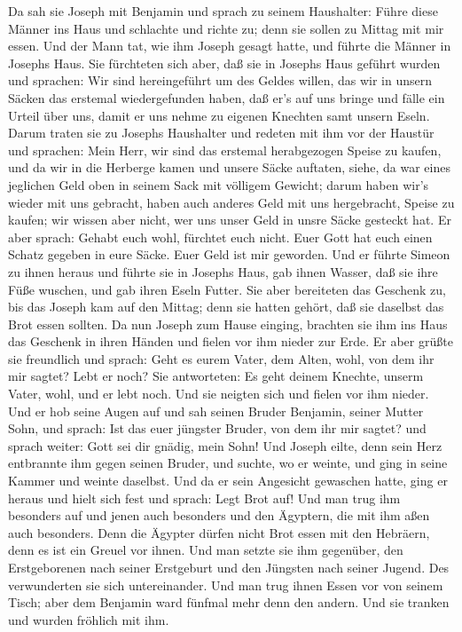  Da sah sie Joseph mit Benjamin und sprach zu seinem
Haushalter: Führe diese Männer ins Haus und schlachte und richte zu;
denn sie sollen zu Mittag mit mir essen.  Und der Mann tat,
wie ihm Joseph gesagt hatte, und führte die Männer in Josephs Haus.
 Sie fürchteten sich aber, daß sie in Josephs Haus geführt
wurden und sprachen: Wir sind hereingeführt um des Geldes willen, das
wir in unsern Säcken das erstemal wiedergefunden haben, daß er's auf uns
bringe und fälle ein Urteil über uns, damit er uns nehme zu eigenen
Knechten samt unsern Eseln.  Darum traten sie zu Josephs
Haushalter und redeten mit ihm vor der Haustür  und
sprachen: Mein Herr, wir sind das erstemal herabgezogen Speise zu
kaufen,  und da wir in die Herberge kamen und unsere Säcke
auftaten, siehe, da war eines jeglichen Geld oben in seinem Sack mit
völligem Gewicht; darum haben wir's wieder mit uns gebracht,
 haben auch anderes Geld mit uns hergebracht, Speise zu
kaufen; wir wissen aber nicht, wer uns unser Geld in unsre Säcke
gesteckt hat.  Er aber sprach: Gehabt euch wohl, fürchtet
euch nicht. Euer Gott hat euch einen Schatz gegeben in eure Säcke. Euer
Geld ist mir geworden. Und er führte Simeon zu ihnen heraus
 und führte sie in Josephs Haus, gab ihnen Wasser, daß sie
ihre Füße wuschen, und gab ihren Eseln Futter.  Sie aber
bereiteten das Geschenk zu, bis das Joseph kam auf den Mittag; denn sie
hatten gehört, daß sie daselbst das Brot essen sollten.  Da
nun Joseph zum Hause einging, brachten sie ihm ins Haus das Geschenk in
ihren Händen und fielen vor ihm nieder zur Erde.  Er aber
grüßte sie freundlich und sprach: Geht es eurem Vater, dem Alten, wohl,
von dem ihr mir sagtet? Lebt er noch?  Sie antworteten: Es
geht deinem Knechte, unserm Vater, wohl, und er lebt noch. Und sie
neigten sich und fielen vor ihm nieder.  Und er hob seine
Augen auf und sah seinen Bruder Benjamin, seiner Mutter Sohn, und
sprach: Ist das euer jüngster Bruder, von dem ihr mir sagtet? und sprach
weiter: Gott sei dir gnädig, mein Sohn!  Und Joseph eilte,
denn sein Herz entbrannte ihm gegen seinen Bruder, und suchte, wo er
weinte, und ging in seine Kammer und weinte daselbst.  Und
da er sein Angesicht gewaschen hatte, ging er heraus und hielt sich fest
und sprach: Legt Brot auf!  Und man trug ihm besonders auf
und jenen auch besonders und den Ägyptern, die mit ihm aßen auch
besonders. Denn die Ägypter dürfen nicht Brot essen mit den Hebräern,
denn es ist ein Greuel vor ihnen.  Und man setzte sie ihm
gegenüber, den Erstgeborenen nach seiner Erstgeburt und den Jüngsten
nach seiner Jugend. Des verwunderten sie sich untereinander.
 Und man trug ihnen Essen vor von seinem Tisch; aber dem
Benjamin ward fünfmal mehr denn den andern. Und sie tranken und wurden
fröhlich mit ihm.

